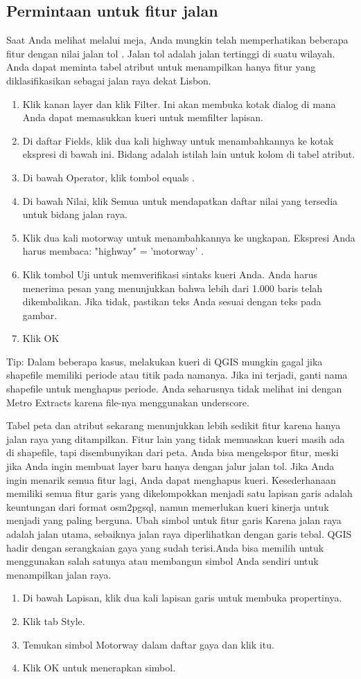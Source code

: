 \subsection{Permintaan untuk fitur jalan}
Saat Anda melihat melalui meja, Anda mungkin telah memperhatikan beberapa fitur dengan nilai jalan tol . Jalan tol adalah jalan tertinggi di suatu wilayah. Anda dapat meminta tabel atribut untuk menampilkan hanya fitur yang diklasifikasikan sebagai jalan raya dekat Lisbon.
\begin{enumerate}
\item
Klik kanan layer dan klik Filter. Ini akan membuka kotak dialog di mana Anda dapat memasukkan kueri untuk memfilter lapisan.
\item
Di daftar Fields, klik dua kali highway untuk menambahkannya ke kotak ekspresi di bawah ini. Bidang adalah istilah lain untuk kolom di tabel atribut.
\item
Di bawah Operator, klik tombol equals .
\item
Di bawah Nilai, klik Semua untuk mendapatkan daftar nilai yang tersedia untuk bidang jalan raya.
\item
Klik dua kali motorway untuk menambahkannya ke ungkapan. Ekspresi Anda harus membaca: "highway" = 'motorway' .
 \item
Klik tombol Uji untuk memverifikasi sintaks kueri Anda. Anda harus menerima pesan yang menunjukkan bahwa lebih dari 1.000 baris telah dikembalikan. Jika tidak, pastikan teks Anda sesuai dengan teks pada gambar.
\item
Klik OK
\end{enumerate}

Tip: Dalam beberapa kasus, melakukan kueri di QGIS mungkin gagal jika shapefile memiliki periode atau titik pada namanya. Jika ini terjadi, ganti nama shapefile untuk menghapus periode. Anda seharusnya tidak melihat ini dengan Metro Extracts karena file-nya menggunakan underscore.

Tabel peta dan atribut sekarang menunjukkan lebih sedikit fitur karena hanya jalan raya yang ditampilkan. Fitur lain yang tidak memuaskan kueri masih ada di shapefile, tapi disembunyikan dari peta. Anda bisa mengekspor fitur, meski jika Anda ingin membuat layer baru hanya dengan jalur jalan tol. Jika Anda ingin menarik semua fitur lagi, Anda dapat menghapus kueri.
Kesederhanaan memiliki semua fitur garis yang dikelompokkan menjadi satu lapisan garis adalah keuntungan dari format osm2pgsql, namun memerlukan kueri kinerja untuk menjadi yang paling berguna.
Ubah simbol untuk fitur garis
Karena jalan raya adalah jalan utama, sebaiknya jalan raya diperlihatkan dengan garis tebal. QGIS hadir dengan serangkaian gaya yang sudah terisi.Anda bisa memilih untuk menggunakan salah satunya atau membangun simbol Anda sendiri untuk menampilkan jalan raya.
\begin{enumerate}
\item 
Di bawah Lapisan, klik dua kali lapisan garis untuk membuka propertinya.
\item
Klik tab Style.
\item
Temukan simbol Motorway dalam daftar gaya dan klik itu.
\item
Klik OK untuk menerapkan simbol.
\end{enumerate}
 
